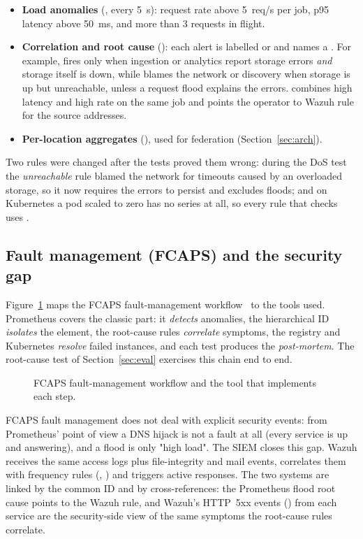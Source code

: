 \begin{itemize}
  \item \textbf{Load anomalies} (, every 5~s): request rate above 5~req/s
        per job, p95 latency above 50~ms, and more than 3 requests in flight.
  \item \textbf{Correlation and root cause} (): each alert is labelled
         or  and names a . For example,
         fires only when ingestion or analytics report storage errors
        \emph{and} storage itself is down, while  blames the
        network or discovery when storage is up but unreachable, unless a request flood explains the
        errors.  combines high latency and high rate on the same job
        and points the operator to Wazuh rule  for the source addresses.
  \item \textbf{Per-location aggregates} (), used for federation
        (Section~\ref{sec:arch}).
\end{itemize}

Two rules were changed after the tests proved them wrong: during the DoS test the
\emph{unreachable} rule blamed the network for timeouts caused by an overloaded storage, so it now
requires the errors to persist and excludes floods; and on Kubernetes a pod scaled to zero has no
 series at all, so every rule that checks  uses .

\subsection{Fault management (FCAPS) and the security gap}

Figure~\ref{fig:fcaps} maps the FCAPS fault-management workflow~\cite{itu2000m3400} to the tools used.
Prometheus covers the classic part: it \emph{detects} anomalies, the hierarchical ID
\emph{isolates} the element, the root-cause rules \emph{correlate} symptoms, the registry and
Kubernetes \emph{resolve} failed instances, and each test produces the \emph{post-mortem}. The
root-cause test of Section~\ref{sec:eval} exercises this chain end to end.

\begin{figure}[ht]
\centering
\resizebox{\textwidth}{!}{}
\caption{FCAPS fault-management workflow and the tool that implements each step.}
\label{fig:fcaps}
\end{figure}

FCAPS fault management does not deal with explicit security events: from Prometheus' point of view a
DNS hijack is not a fault at all (every service is up and answering), and a flood is only "high
load". The SIEM closes this gap. Wazuh receives the same access logs plus file-integrity and mail
events, correlates them with frequency rules (, ) and triggers active
responses. The two systems are linked by the common ID and by cross-references: the Prometheus flood
root cause points to the Wazuh rule, and Wazuh's HTTP~5xx events () from each service
are the security-side view of the same symptoms the root-cause rules correlate.
